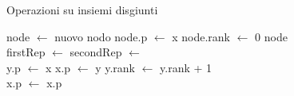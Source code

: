 \begin{algorithm}[H]
    \caption{Operazioni su insiemi disgiunti \cite{intro_algo}}
    \begin{algorithmic}[1]
            \State node $\gets$ nuovo nodo
            \State node.p $\gets$ x
            \State node.rank $\gets$ 0
            \State \Return node
        \EndProcedure\\

            \State firstRep $\gets$ 
            \State secondRep $\gets$ 
            \State {}
        \EndProcedure\\

                \State y.p $\gets$ x
            \Else
                \State x.p $\gets$ y
                    \State y.rank $\gets$ y.rank + 1
                \EndIf
            \EndIf
        \EndProcedure\\

                \State x.p $\gets$ 
            \EndIf
            \State \Return x.p
        \EndProcedure
    \end{algorithmic}
\end{algorithm}